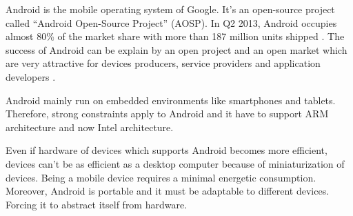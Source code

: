 \documentclass{sigplanconf}
\def \ANDROID{\mbox{Android}\xspace}
\begin{document}
    \ANDROID is the mobile operating system of Google.
    It's an open-source project called ``\ANDROID Open-Source Project'' (AOSP).
    In Q2 2013, \ANDROID occupies almost 80\% of the market share with more than 187 million units shipped \cite{idc-website}.
    The success of \ANDROID can be explain by an open project and an open market
    which are very attractive for devices producers, service providers and application developers \cite{ieee-butler-android-landscape}.

    \ANDROID mainly run on embedded environments like smartphones and tablets.
    Therefore, strong constraints apply to \ANDROID
    and it have to support ARM architecture and now Intel architecture.
    
    Even if hardware of devices which supports \ANDROID becomes more efficient,
    devices can't be as efficient as a desktop computer because of miniaturization of devices.
    Being a mobile device requires a minimal energetic consumption.
    Moreover, \ANDROID is portable and it must be adaptable to different devices.
    Forcing it to abstract itself from hardware.
\end{document}
